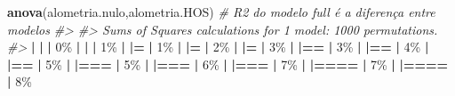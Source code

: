 \documentclass[
]{book}
\newenvironment{Shaded}{\begin{snugshade}}{\end{snugshade}}
\newcommand{\CommentTok}[1]{\textcolor[rgb]{0.56,0.35,0.01}{\textit{#1}}}
\newcommand{\DecValTok}[1]{\textcolor[rgb]{0.00,0.00,0.81}{#1}}
\newcommand{\ErrorTok}[1]{\textcolor[rgb]{0.64,0.00,0.00}{\textbf{#1}}}
\newcommand{\FunctionTok}[1]{\textcolor[rgb]{0.13,0.29,0.53}{\textbf{#1}}}
\newcommand{\NormalTok}[1]{#1}
\newcommand{\SpecialCharTok}[1]{\textcolor[rgb]{0.81,0.36,0.00}{\textbf{#1}}}
\begin{document}
\begin{Shaded}
\begin{Highlighting}[]
\FunctionTok{anova}\NormalTok{(alometria.nulo,alometria.HOS) }\CommentTok{\# R2 do modelo full é a diferença entre modelos}
\CommentTok{\#\textgreater{} }
\CommentTok{\#\textgreater{} Sums of Squares calculations for 1 model: 1000 permutations.}
\CommentTok{\#\textgreater{} }
  \SpecialCharTok{|}                                                        
  \ErrorTok{|}                                                  \ErrorTok{|}   \DecValTok{0}\NormalTok{\%}
  \SpecialCharTok{|}                                                        
  \ErrorTok{|}                                                  \ErrorTok{|}   \DecValTok{1}\NormalTok{\%}
  \SpecialCharTok{|}                                                        
  \ErrorTok{|=}                                                 \ErrorTok{|}   \DecValTok{1}\NormalTok{\%}
  \SpecialCharTok{|}                                                        
  \ErrorTok{|=}                                                 \ErrorTok{|}   \DecValTok{2}\NormalTok{\%}
  \SpecialCharTok{|}                                                        
  \ErrorTok{|=}                                                 \ErrorTok{|}   \DecValTok{3}\NormalTok{\%}
  \SpecialCharTok{|}                                                        
  \ErrorTok{|==}                                                \ErrorTok{|}   \DecValTok{3}\NormalTok{\%}
  \SpecialCharTok{|}                                                        
  \ErrorTok{|==}                                                \ErrorTok{|}   \DecValTok{4}\NormalTok{\%}
  \SpecialCharTok{|}                                                        
  \ErrorTok{|==}                                                \ErrorTok{|}   \DecValTok{5}\NormalTok{\%}
  \SpecialCharTok{|}                                                        
  \ErrorTok{|===}                                               \ErrorTok{|}   \DecValTok{5}\NormalTok{\%}
  \SpecialCharTok{|}                                                        
  \ErrorTok{|===}                                               \ErrorTok{|}   \DecValTok{6}\NormalTok{\%}
  \SpecialCharTok{|}                                                        
  \ErrorTok{|===}                                               \ErrorTok{|}   \DecValTok{7}\NormalTok{\%}
  \SpecialCharTok{|}                                                        
  \ErrorTok{|====}                                              \ErrorTok{|}   \DecValTok{7}\NormalTok{\%}
  \SpecialCharTok{|}                                                        
  \ErrorTok{|====}                                              \ErrorTok{|}   \DecValTok{8}\NormalTok{\%}

\end{Highlighting}
\end{Shaded}
\end{document}
